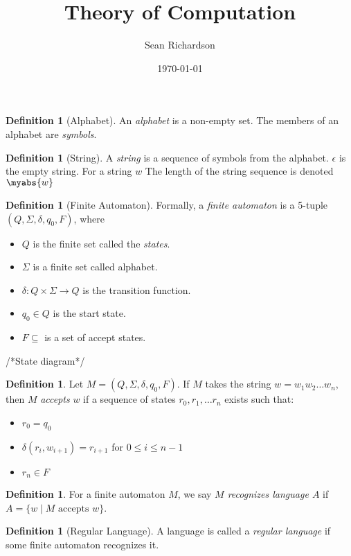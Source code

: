 \documentclass[11pt]{article}
\title{Theory of Computation}
\author{Sean Richardson}
\date{\today}
\theoremstyle{definition}
\newtheorem{definition}[theorem]{Definition}
\begin{document}
\maketitle

\section{}

\begin{definition}[Alphabet]
An \emph{alphabet} is a non-empty set. The members of an alphabet are
\emph{symbols}.
\end{definition}

\begin{definition}[String]
    A \emph{string} is a sequence of symbols from the alphabet. $\epsilon$
    is the empty string. For a string $w$ The length of the string sequence
    is denoted $\myabs{w}$
\end{definition}

\begin{definition}[Finite Automaton]
    Formally, a \emph{finite automaton} is a 5-tuple
    $(Q,\Sigma,\delta,q_0,F)$, where
    \begin{itemize}
        \item $Q$ is the finite set called the \emph{states}.
        \item $\Sigma$ is a finite set called alphabet.
        \item $\delta: Q \times \Sigma \rightarrow Q$ is the transition
            function.
        \item $q_0 \in Q$ is the start state.
        \item $F \subseteq$ is a set of accept states.
    \end{itemize}
\end{definition}

/*State diagram*/

\begin{definition}
    Let $M= (Q,\Sigma,\delta,q_0,F)$. If $M$ takes the string
    $w=w_1w_2\dots w_n$, then $M$ \emph{accepts} $w$ if a sequence of states
    ${r_0,r_1,\dots r_n}$ exists such that:
    \begin{itemize}
        \item $r_0 = q_0$
        \item $\delta (r_i,w_{i+1})=r_{i+1}$ for $0 \leq i \leq n-1$
        \item $r_n \in F$
    \end{itemize}
\end{definition}

\begin{definition}
    For a finite automaton $M$, we say \emph{$M$ recognizes language $A$}
    if $A = \{ w \mid M \text{ accepts } w \}$.
\end{definition}

\begin{definition}[Regular Language]
    A language is called a \emph{regular language} if some finite automaton
    recognizes it.
\end{definition}
\end{document}
